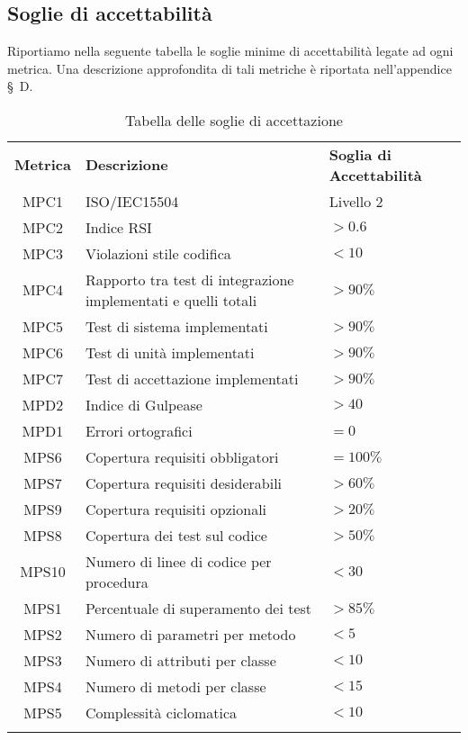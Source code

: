 \newpage

\subsection{Soglie di accettabilità}
Riportiamo nella seguente tabella le soglie minime di accettabilità legate ad ogni metrica. Una descrizione approfondita di tali metriche è riportata nell'appendice \S\ D.

\begin{longtable}{| c | p{8cm} | p{2.5cm} |}
	\rowcolor{LightBlue}
	\color{white}\bfseries Metrica & \color{white}\bfseries Descrizione &\color{white}\bfseries Soglia di \newline Accettabilità \\
	MPC1 & ISO/IEC15504 & Livello 2 \\ \hline
	MPC2 & Indice RSI & $> 0.6$ \\ \hline
	MPC3 & Violazioni stile codifica & $< 10$ \\ \hline
	MPC4 & Rapporto tra test di integrazione implementati e quelli totali & $> 90\%$\\ \hline
	MPC5 & Test di sistema implementati & $> 90\%$\\ \hline
	MPC6 & Test di unità implementati & $> 90\%$\\ \hline
	MPC7 & Test di accettazione implementati & $> 90\%$\\ \hline
	MPD2 & Indice di Gulpease & $> 40$\\ \hline
	MPD1 & Errori ortografici & $= 0$\\ \hline
	MPS6 & Copertura requisiti obbligatori & $= 100\%$\\ \hline
	MPS7 & Copertura requisiti desiderabili & $> 60\%$\\ \hline
	MPS9 & Copertura requisiti opzionali & $> 20\%$\\ \hline
	MPS8 & Copertura dei test sul codice & $> 50\%$\\ \hline
	MPS10 & Numero di linee di codice per procedura & $< 30$ \\ \hline
	MPS1 & Percentuale di superamento dei test & $> 85\%$\\ \hline
	MPS2 & Numero di parametri per metodo & $< 5$\\ \hline
	MPS3 & Numero di attributi per classe & $< 10$\\ \hline
	MPS4 & Numero di metodi per classe & $< 15$\\ \hline
	MPS5 & Complessità ciclomatica & $< 10$ \\ \hline
	\caption{Tabella delle soglie di accettazione}
\end{longtable}


